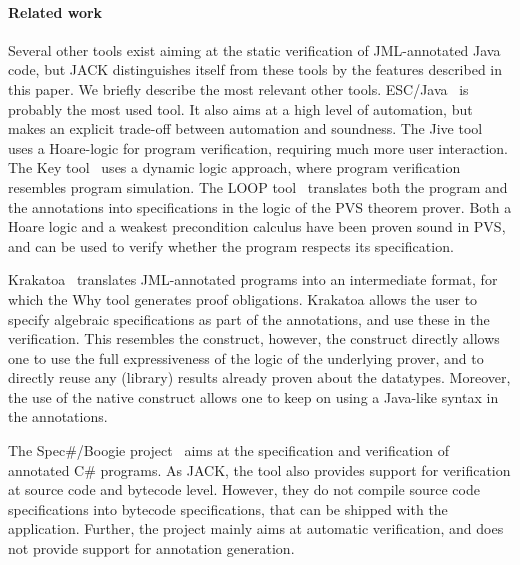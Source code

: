
\paragraph{Related work}
Several other tools exist aiming at the static verification of
JML-annotated Java code, but JACK distinguishes itself from these
tools by the features described in this paper. We briefly describe the
most relevant other tools. ESC/Java~\cite{CokK04} is probably the most
used tool. It also aims at a high level of automation, but makes an
explicit trade-off between automation and
soundness. 
The Jive tool~\cite{MeyerP00} uses a Hoare-logic for program
verification, requiring much more user interaction. The Key
tool~\cite{BeckertHS07} uses a dynamic logic approach, where program
verification resembles program simulation. The LOOP
tool~\cite{BergJ01} translates both the program and the annotations
into specifications in the logic of the PVS theorem prover. Both a
Hoare logic and a weakest precondition calculus have been proven sound
in PVS, and can be used to verify whether the program respects its
specification.

Krakatoa~\cite{MarcheP-MU04} translates JML-annotated
programs into an intermediate format, for which the Why tool generates
proof obligations. Krakatoa allows the user to specify algebraic
specifications as part of the annotations, and use these in the
verification. This resembles the \native construct, however, the
\native construct directly allows one to use the full expressiveness
of the logic of the underlying prover, and to directly reuse any
(library) results already proven about the datatypes. Moreover, the
use of the native construct allows one to keep on using a Java-like
syntax in the annotations.

The Spec\#/Boogie project~\cite{BarnettLW04} aims at the specification
and verification of annotated C\# programs. As JACK, the tool also
provides support for verification at source code and bytecode
level. However, they do not compile source code specifications into
bytecode specifications, that can be shipped with the
application. Further, the project mainly aims at automatic
verification, and does not provide support for annotation generation.

